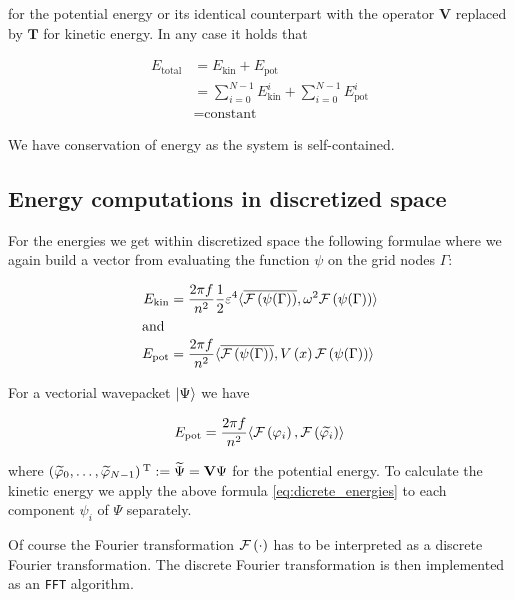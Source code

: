 for the potential energy or its identical counterpart with the operator $\mathbf{V}$ replaced
by $\mathbf{T}$ for kinetic energy. In any case it holds that

\begin{equation}
\begin{split}
  E_{\text{total}} & = E_{\text{kin}} + E_{\text{pot}} \\
                   & = \sum_{i=0}^{N-1} E_{\text{kin}}^i + \sum_{i=0}^{N-1} E_{\text{pot}}^i \\
                   & = \text{constant}
\end{split}
\end{equation}

We have conservation of energy as the system is self-contained.

\subsection{Energy computations in discretized space}

For the energies we get within discretized space the following formulae where we
again build a vector from evaluating the function $\psi$ on the grid nodes $\Gamma$:

\begin{align} \label{eq:dicrete_energies}
  E_{\text{kin}} & = \frac{2 \pi f}{n^2} \frac{1}{2} \varepsilon^4 \langle \overline{\mathcal{F}\left(\psi(\Gamma)\right)} , {\omega^2 \mathcal{F}\left(\psi(\Gamma)\right)} \rangle \\
  \intertext{and}
  E_{\text{pot}} & = \frac{2 \pi f}{n^2} \langle \overline{\mathcal{F}\left(\psi(\Gamma)\right)} , {V\left( x \right) \mathcal{F}\left(\psi(\Gamma)\right)} \rangle
\end{align}

For a vectorial wavepacket $\Ket{\Psi}$ we have

\begin{equation}
  E_{\text{pot}} = \frac{2 \pi f}{n^2} \langle \mathcal{F}\left(\varphi_i\right) , \mathcal{F}\left(\widetilde{\varphi_i}\right) \rangle
\end{equation}

where $\left(\widetilde{\varphi}_0, \ldots, \widetilde{\varphi}_{N-1} \right){}^{\textnormal{T}} := \widetilde{\Psi} = \mathbf{V} \Psi$
for the potential energy. To calculate the kinetic energy we apply the above formula \eqref{eq:dicrete_energies}
to each component $\psi_i$ of $\Psi$ separately.

Of course the Fourier transformation $\mathcal{F}\left(\cdot\right)$ has to be interpreted as a discrete
Fourier transformation. The discrete Fourier transformation is then implemented as
an \texttt{FFT} algorithm.
